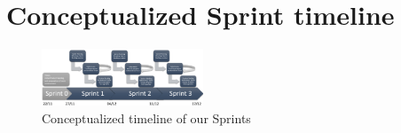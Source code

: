 \section{Conceptualized Sprint timeline}
\label{sec:sprint-timeline}

\begin{figure}[htb]
\centering
    \includegraphics[angle=90, width=0.43\textwidth]{SCRUM/graphics/sprinttimeline.png}
    \caption{Conceptualized timeline of our Sprints}
    \label{fig:PropProf}
\end{figure}